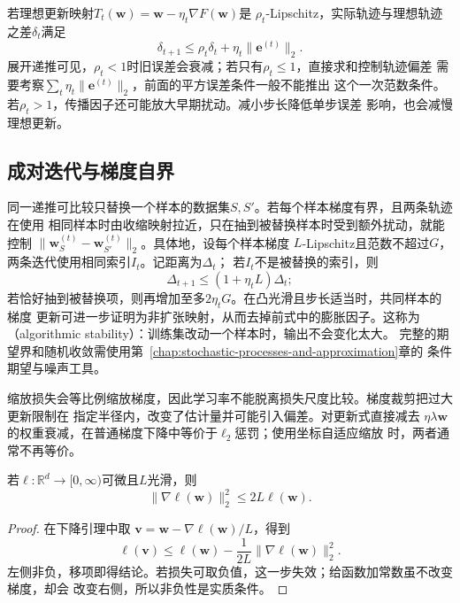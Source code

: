 若理想更新映射$T_t(\bm{w})=\bm{w}-\eta_t\nabla F(\bm{w})$是
$\rho_t$-Lipschitz，实际轨迹与理想轨迹之差$\delta_t$满足
\begin{equation}
  \delta_{t+1}\leq\rho_t\delta_t+\eta_t\lVert\bm{e}^{(t)}\rVert_2.
  \label{eq:opt-inexact-gradient-recurrence}
\end{equation}
展开递推可见，$\rho_t<1$时旧误差会衰减；若只有$\rho_t\leq1$，直接求和控制轨迹偏差
需要考察$\sum_t\eta_t\lVert\bm{e}^{(t)}\rVert_2$，前面的平方误差条件一般不能推出
这个一次范数条件。若$\rho_t>1$，传播因子还可能放大早期扰动。减小步长降低单步误差
影响，也会减慢理想更新。

\subsection{成对迭代与梯度自界}

同一递推可比较只替换一个样本的数据集$S,S'$。若每个样本梯度有界，且两条轨迹在使用
相同样本时由收缩映射拉近，只在抽到被替换样本时受到额外扰动，就能控制
$\lVert\bm{w}_S^{(t)}-\bm{w}_{S'}^{(t)}\rVert_2$。具体地，设每个样本梯度
$L$-Lipschitz且范数不超过$G$，两条迭代使用相同索引$I_t$。记距离为$\Delta_t$；
若$I_t$不是被替换的索引，则
\[
  \Delta_{t+1}\leq(1+\eta_tL)\Delta_t;
\]
若恰好抽到被替换项，则再增加至多$2\eta_tG$。在凸光滑且步长适当时，共同样本的梯度
更新可进一步证明为非扩张映射，从而去掉前式中的膨胀因子。这称为
（algorithmic stability）：训练集改动一个样本时，输出不会变化太大。
完整的期望界和随机收敛需使用第~\ref{chap:stochastic-processes-and-approximation}章的
条件期望与噪声工具。

缩放损失会等比例缩放梯度，因此学习率不能脱离损失尺度比较。梯度裁剪把过大更新限制在
指定半径内，改变了估计量并可能引入偏差。对更新式直接减去
$\eta\lambda\bm{w}$的权重衰减，在普通梯度下降中等价于$\ell_2$惩罚；使用坐标自适应缩放
时，两者通常不再等价。

\begin{lemma}[非负光滑函数的梯度自界]
\label{lem:opt-self-bounding}
若$\ell:\mathbb{R}^d\to[0,\infty)$可微且$L$光滑，则
\[
  \lVert\nabla\ell(\bm{w})\rVert_2^2\leq2L\ell(\bm{w}).
\]
\end{lemma}

\begin{proof}
在下降引理中取
$\bm{v}=\bm{w}-\nabla\ell(\bm{w})/L$，得到
\[
  \ell(\bm{v})
  \leq\ell(\bm{w})-\frac{1}{2L}
  \lVert\nabla\ell(\bm{w})\rVert_2^2.
\]
左侧非负，移项即得结论。若损失可取负值，这一步失效；给函数加常数虽不改变梯度，却会
改变右侧，所以非负性是实质条件。
\end{proof}

